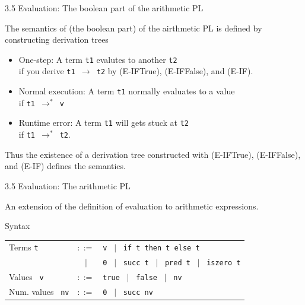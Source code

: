 \documentclass[table]{beamer}
\begin{document}
\begin{frame}[t]{3.5 Evaluation: The boolean part of the arithmetic PL} \vspace{10pt}

The semantics of (the boolean part) of the airthmetic PL is defined by constructing derivation trees

\begin{itemize}
\item One-step: A term \texttt{t1} evalutes to another \texttt{t2}\\
if you derive \texttt{t1 $\rightarrow$ t2} by (E-IFTrue), (E-IFFalse), and (E-IF).
\item Normal execution: A term \texttt{t1} normally evaluates to a value \\
if \texttt{t1 $\rightarrow^*$ v}
\item Runtime error: A term \texttt{t1} will gets stuck at \texttt{t2} \\ if \texttt{t1 $\rightarrow^*$ t2}.
\end{itemize}

\vspace{10pt}

Thus the existence of a derivation tree constructed with (E-IFTrue), (E-IFFalse), and (E-IF) defines the semantics. 

\end{frame}

\begin{frame}[t]{3.5 Evaluation: The arithmetic PL} 

An extension of the definition of evaluation to arithmetic expressions. 

\vspace{10pt}

Syntax

\vspace{5pt}

\begin{tabular}{l c l }
Terms \texttt{t} & $::=$ &
	\texttt{v} \ $|$ \ \texttt{if t then t else t} \\
	& $|$ & \texttt{0} \ $|$ \ \texttt{succ t} \ $|$ \ \texttt{pred t} \ $|$ \ \texttt{iszero t} \\
Values \  \texttt{v} & $::=$ & \texttt{true} \ $|$ \ \texttt{false} \ $|$ \ \texttt{nv}\\
Num. values \ \texttt{nv} & $::=$ & \texttt{0} \ $|$ \ \texttt{succ nv}
\end{tabular}

\end{frame}
\end{document}
